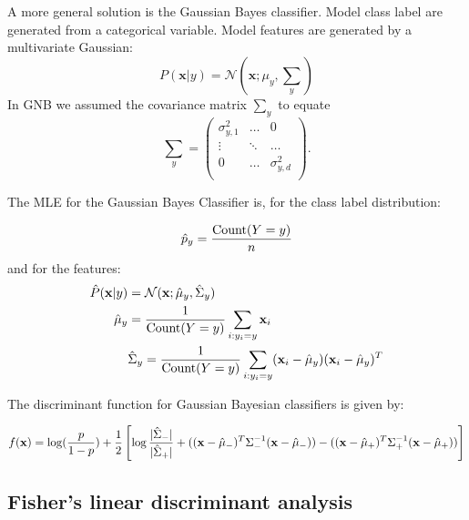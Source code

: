 \documentclass[a4paper,10pt,twoside]{article}
\begin{document}
A more general solution is the Gaussian Bayes classifier. Model class label are generated from a categorical variable. Model features are generated by a multivariate Gaussian:
\begin{equation*}
  P(\mathbf{x}|y)=\mathcal{N}(\mathbf{x};\mu_y,\sum_y)
\end{equation*}
In GNB we assumed the covariance matrix $\sum_y$ to equate
\begin{equation*}
  \sum_y =
  \begin{pmatrix}
    \sigma_{y,1}^2 & \ldots & 0 \\
    \vdots & \ddots & \ldots \\
    0 & \ldots & \sigma_{y,d}^2 \\
  \end{pmatrix}.
\end{equation*}

The MLE for the Gaussian Bayes Classifier is, for the class label distribution:

\begin{equation*}
  \hat{p}_y={\text{Count}(Y=y)\over n}
\end{equation*}
and for the features:
\begin{align*}
 \hat{P}(\mathbf{x}|y) &= \mathcal{N}(\mathbf{x};\hat{\mu}_y,\hat{\Sigma}_y)\\
  \hat{\mu}_y &= {1\over \text{Count}(Y=y)}\sum_{i:y_i=y}\mathbf{x}_i\\
  &\hat{\Sigma}_y={1\over \text{Count}(Y=y)}\sum_{i:y_i=y}(\mathbf{x}_i-\hat{\mu}_y)(\mathbf{x}_i-\hat{\mu}_y)^T\\
\end{align*}

The discriminant function for Gaussian Bayesian classifiers is given by:

\begin{equation}\label{eq:discriminantgbc}
  f(\mathbf{x})=\log({p\over 1-p})+{1\over 2}\left[\log{|\hat{\Sigma}_-|\over|\hat{\Sigma}_+|}+((\mathbf{x}-\hat{\mu}_-)^T\Sigma_-^{-1}(\mathbf{x}-\hat{\mu}_-))-((\mathbf{x}-\hat{\mu}_+)^T\Sigma_+^{-1}(\mathbf{x}-\hat{\mu}_+))\right]
\end{equation}

\subsection{Fisher's linear discriminant analysis}
\end{document}
